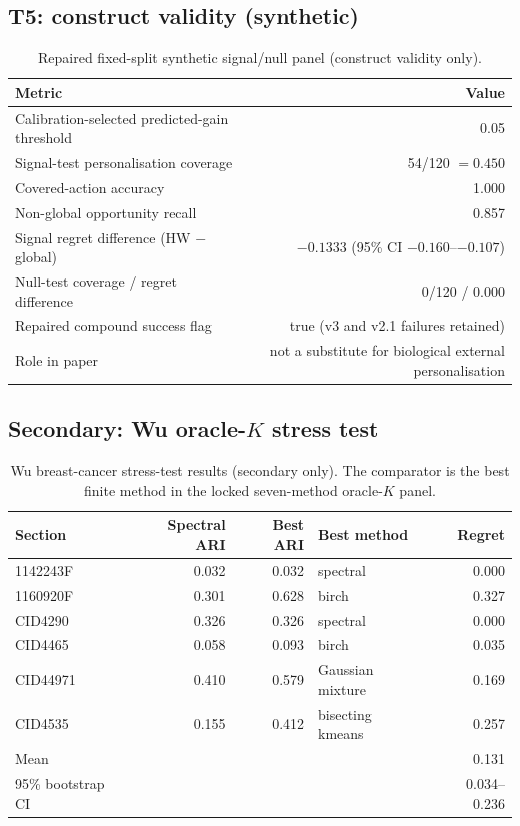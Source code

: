 \documentclass[11pt]{article}
\begin{document}
\subsection{T5: construct validity (synthetic)}

\begin{table}[ht]
\centering
\caption{Repaired fixed-split synthetic signal/null panel (construct validity only).
\label{tab:si-t5}}
\begin{tabular}{@{}lr@{}}
\toprule
Metric & Value \\
\midrule
Calibration-selected predicted-gain threshold & 0.05 \\
Signal-test personalisation coverage & 54/120 $=0.450$ \\
Covered-action accuracy & 1.000 \\
Non-global opportunity recall & 0.857 \\
Signal regret difference (HW $-$ global) & $-0.1333$ (95\% CI $-0.160$--$-0.107$) \\
Null-test coverage / regret difference & 0/120 / 0.000 \\
Repaired compound success flag & true (v3 and v2.1 failures retained) \\
Role in paper & not a substitute for biological external personalisation \\
\bottomrule
\end{tabular}
\end{table}

\subsection{Secondary: Wu oracle-\(K\) stress test}

\begin{table}[ht]
\centering
\caption{Wu breast-cancer stress-test results (secondary only). The comparator
is the best finite method in the locked seven-method oracle-\(K\) panel.
\label{tab:wu}}
\begin{tabular}{@{}lrrlr@{}}
\toprule
Section & Spectral ARI & Best ARI & Best method & Regret \\
\midrule
1142243F & 0.032 & 0.032 & spectral & 0.000 \\
1160920F & 0.301 & 0.628 & birch & 0.327 \\
CID4290 & 0.326 & 0.326 & spectral & 0.000 \\
CID4465 & 0.058 & 0.093 & birch & 0.035 \\
CID44971 & 0.410 & 0.579 & Gaussian mixture & 0.169 \\
CID4535 & 0.155 & 0.412 & bisecting kmeans & 0.257 \\
\midrule
Mean & & & & 0.131 \\
95\% bootstrap CI & & & & 0.034--0.236 \\
\bottomrule
\end{tabular}
\end{table}
\end{document}
